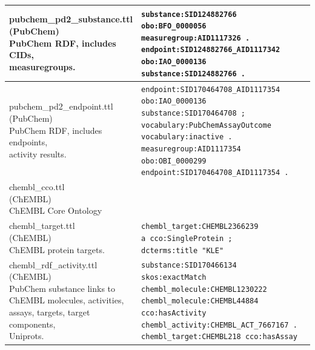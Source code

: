 \begin{singlespace}
\begin{longtable}{p{0.4\linewidth}p{0.6\linewidth}}
\hline
\makecell[l]{pubchem\_pd2\_substance.ttl \\ (PubChem)  \\  PubChem RDF, includes CIDs,\\ measuregroups. } & \makecell[l]{\texttt{substance:SID124882766}\\ \texttt{obo:BFO\_0000056 measuregroup:AID1117326 .}\\ \texttt{endpoint:SID124882766\_AID1117342}\\ \texttt{obo:IAO\_0000136}\\ \texttt{substance:SID124882766 .}} \\
\hline
\makecell[l]{pubchem\_pd2\_endpoint.ttl \\ (PubChem)  \\  PubChem RDF, includes endpoints,\\ activity results.} & \makecell[l]{\texttt{endpoint:SID170464708\_AID1117354}\\ \texttt{obo:IAO\_0000136 substance:SID170464708 ;}\\ \texttt{vocabulary:PubChemAssayOutcome}\\ \texttt{vocabulary:inactive .}\\ \texttt{measuregroup:AID1117354}\\ \texttt{obo:OBI\_0000299}\\ \texttt{endpoint:SID170464708\_AID1117354 .}} \\
\hline
\makecell[l]{chembl\_cco.ttl \\ (ChEMBL) \\ ChEMBL Core Ontology} & \\
\hline
\makecell[l]{chembl\_target.ttl \\ (ChEMBL) \\ ChEMBL protein targets.} & \makecell[l]{\texttt{chembl\_target:CHEMBL2366239}\\ \texttt{a cco:SingleProtein ;}\\ \texttt{dcterms:title "KLE"}} \\
\hline
\makecell[l]{chembl\_rdf\_activity.ttl \\ (ChEMBL) \\ PubChem substance links to\\ ChEMBL molecules, activities,\\ assays, targets, target components,\\ Uniprots.} & \makecell[l]{\texttt{substance:SID170466134}\\ \texttt{skos:exactMatch}\\ \texttt{chembl\_molecule:CHEMBL1230222}\\ \texttt{chembl\_molecule:CHEMBL44884}\\ \texttt{cco:hasActivity}\\ \texttt{chembl\_activity:CHEMBL\_ACT\_7667167 .}\\ \texttt{chembl\_target:CHEMBL218 cco:hasAssay}\\
}
\end{longtable}
\end{singlespace}
